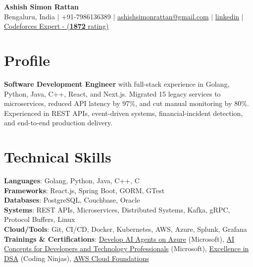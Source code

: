\documentclass[letterpaper,11pt]{article}
\providecommand{\resumeProfile}{
  \textbf{Software Development Engineer} with full-stack experience in Golang, Python, Java, C++, React, and Next.js.
  Migrated 15 legacy services to microservices, reduced API latency by 97\%, and cut manual monitoring by 80\%.
  Experienced in REST APIs, event-driven systems, financial-incident detection, and end-to-end production delivery.
}
\providecommand{\resumeFrameworks}{React.js, Spring Boot, GORM, GTest}
\providecommand{\resumeLanguages}{Golang, Python, Java, C++, C}
\providecommand{\resumeCloudTools}{Git, CI/CD, Docker, Kubernetes, AWS, Azure, Splunk, Grafana}
\begin{document}
\begin{center}
  {\Huge\bfseries Ashish Simon Rattan}\\\vspace{2pt}
  \small Bengaluru, India $|$ +91-7986136389 $|$
  \href{mailto:ashishsimonrattan@gmail.com}{ashishsimonrattan@gmail.com} $|$
  \href{https://www.linkedin.com/in/ashish-simon-rattan}{linkedin} $|$
  \href{https://codeforces.com/profile/pirobie_ultraa}{Codeforces Expert - (\textbf{1872} rating)}
\end{center}
\vspace{-19pt}
\section{Profile}
\resumeProfile
\vspace{-10pt}
\section{Technical Skills}
\begin{itemize}[leftmargin=0in,label={}]
\small{\item{
  \textbf{Languages}: \resumeLanguages \\
  \textbf{Frameworks}: \resumeFrameworks \\
  \textbf{Databases}: PostgreSQL, Couchbase, Oracle \\
  \textbf{Systems}: REST APIs, Microservices, Distributed Systems, Kafka, gRPC, Protocol Buffers, Linux \\
  \textbf{Cloud/Tools}: \resumeCloudTools \\
  \textbf{Trainings \& Certifications}:
  \href{https://learn.microsoft.com/en-in/users/ashishsimonrattan-5889/achievements/nq57gdlf}{Develop AI Agents on Azure} (Microsoft),
  \href{https://learn.microsoft.com/en-in/users/ashishsimonrattan-5889/achievements/zj3p9452}{AI Concepts for Developers and Technology Professionals} (Microsoft),
  \href{https://certificate.codingninjas.com/view/0ef77459f36c3248}{Excellence in DSA} (Coding Ninjas),
  \href{https://www.credly.com/go/eWHG48c5}{AWS Cloud Foundations}
}}
\end{itemize}
\vspace{-14pt}
\end{document}
